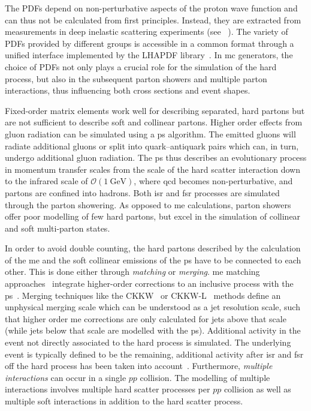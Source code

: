 The \glspl{PDF} depend on non-perturbative aspects of the proton wave function and can thus not be calculated from first principles. Instead, they are extracted from measurements in deep inelastic scattering experiments (see \eg~\cite{Gribov:1972ri, Blumlein:1996wj}). The variety of \glspl{PDF} provided by different groups is accessible in a common format through a unified interface implemented by the \textsc{LHAPDF} library~\cite{Buckley:2014ana}. In \gls{mc} generators, the choice of \glspl{PDF} not only plays a crucial role for the simulation of the hard process, but also in the subsequent parton showers and multiple parton interactions, thus influencing both cross sections and event shapes.

Fixed-order matrix elements work well for describing separated, hard partons but are not sufficient to describe soft and collinear partons. Higher order effects from gluon radiation can be simulated using a \gls{ps} algorithm. The emitted gluons will radiate additional gluons or split into quark--antiquark pairs which can, in turn, undergo additional gluon radiation. The \gls{ps}  thus describes an evolutionary process in momentum transfer scales from the scale of the hard scatter interaction down to the infrared scale of $\mathcal{O}(\SI{1}{\GeV})$, where \gls{qcd} becomes non-perturbative, and partons are confined into hadrons. Both \gls{isr} and \gls{fsr} processes are simulated through the parton showering. As opposed to \gls{me} calculations, parton showers offer poor modelling of few hard partons, but excel in the simulation of collinear and soft multi-parton states.

In order to avoid double counting, the hard partons described by the calculation of the \gls{me} and the soft collinear emissions of the \gls{ps} have to be connected to each other. This is done either through \textit{matching} or \textit{merging}. \gls{me} matching approaches~\cite{Bengtsson:1986hr} integrate higher-order corrections to an inclusive process with the \gls{ps}~\cite{Buckley:2011ms}.
Merging techniques like the CKKW~\cite{Catani:2001cc} or CKKW-L~\cite{Lonnblad:2001iq} methods define an unphysical merging scale which can be understood as a jet resolution scale, such that higher order \gls{me} corrections are only calculated for jets above that scale (while jets below that scale are modelled with the \gls{ps}).
Additional activity in the event not directly associated to the hard process is simulated. The underlying event is typically defined to be the remaining, additional activity after \gls{isr} and \gls{fsr} off the hard process has been taken into account~\cite{Buckley:2011ms}. Furthermore, \textit{multiple interactions} can occur in a single $pp$ collision. The modelling of multiple interactions involves multiple hard scatter processes per $pp$ collision as well as multiple soft interactions in addition to the hard scatter process.

